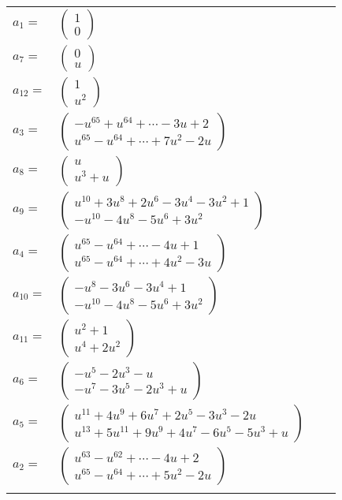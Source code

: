 \documentclass[1p]{elsarticle_modified}
\theoremstyle{definition}
\begin{document}
\begin{tabular}{m{7pt} m{180pt} m{7pt} m{180pt} }
\flushright $a_{1}=$&$\begin{pmatrix}1\\0\end{pmatrix}$ \\
\flushright $a_{7}=$&$\begin{pmatrix}0\\u\end{pmatrix}$ \\
\flushright $a_{12}=$&$\begin{pmatrix}1\\u^2\end{pmatrix}$ \\
\flushright $a_{3}=$&$\begin{pmatrix}- u^{65}+u^{64}+\cdots-3 u+2\\u^{65}- u^{64}+\cdots+7 u^2-2 u\end{pmatrix}$ \\
\flushright $a_{8}=$&$\begin{pmatrix}u\\u^3+u\end{pmatrix}$ \\
\flushright $a_{9}=$&$\begin{pmatrix}u^{10}+3 u^8+2 u^6-3 u^4-3 u^2+1\\- u^{10}-4 u^8-5 u^6+3 u^2\end{pmatrix}$ \\
\flushright $a_{4}=$&$\begin{pmatrix}u^{65}- u^{64}+\cdots-4 u+1\\u^{65}- u^{64}+\cdots+4 u^2-3 u\end{pmatrix}$ \\
\flushright $a_{10}=$&$\begin{pmatrix}- u^8-3 u^6-3 u^4+1\\- u^{10}-4 u^8-5 u^6+3 u^2\end{pmatrix}$ \\
\flushright $a_{11}=$&$\begin{pmatrix}u^2+1\\u^4+2 u^2\end{pmatrix}$ \\
\flushright $a_{6}=$&$\begin{pmatrix}- u^5-2 u^3- u\\- u^7-3 u^5-2 u^3+u\end{pmatrix}$ \\
\flushright $a_{5}=$&$\begin{pmatrix}u^{11}+4 u^9+6 u^7+2 u^5-3 u^3-2 u\\u^{13}+5 u^{11}+9 u^9+4 u^7-6 u^5-5 u^3+u\end{pmatrix}$ \\
\flushright $a_{2}=$&$\begin{pmatrix}u^{63}- u^{62}+\cdots-4 u+2\\u^{65}- u^{64}+\cdots+5 u^2-2 u\end{pmatrix}$\\&\end{tabular}
\end{document}
